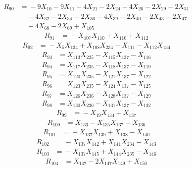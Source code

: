 \[\begin{aligned}
R_{90} &={}-9X_{10} - 9X_{11} - 4X_{21} - 2X_{24} - 4X_{26} - 2X_{29} - 2X_{31}\\
&\quad{} - 4X_{32} - 2X_{34} - 2X_{36} - 4X_{39} - 2X_{40} - 2X_{43} - 2X_{47}\\
&\quad{} - 4X_{68} - 2X_{69} + X_{105}
\end{aligned}\]
\[\begin{aligned}
R_{91} &={}-X_{107}X_{110} + X_{110} + X_{112}
\end{aligned}\]
\[\begin{aligned}
R_{92} &={}-X_{5}X_{134} + X_{108}X_{234} - X_{111} - X_{112}X_{134}
\end{aligned}\]
\[\begin{aligned}
R_{93} &={}X_{113}X_{235} - X_{115}X_{137} - X_{116}
\end{aligned}\]
\[\begin{aligned}
R_{94} &={}X_{117}X_{235} - X_{118}X_{137} - X_{119}
\end{aligned}\]
\[\begin{aligned}
R_{95} &={}X_{120}X_{235} - X_{121}X_{137} - X_{122}
\end{aligned}\]
\[\begin{aligned}
R_{96} &={}X_{123}X_{235} - X_{124}X_{137} - X_{125}
\end{aligned}\]
\[\begin{aligned}
R_{97} &={}X_{126}X_{236} - X_{128}X_{137} - X_{129}
\end{aligned}\]
\[\begin{aligned}
R_{98} &={}X_{130}X_{236} - X_{131}X_{137} - X_{132}
\end{aligned}\]
\[\begin{aligned}
R_{99} &={}-X_{19}X_{134} + X_{137}
\end{aligned}\]
\[\begin{aligned}
R_{100} &={}X_{133} - X_{135}X_{137} - X_{136}
\end{aligned}\]
\[\begin{aligned}
R_{101} &={}-X_{137}X_{139} + X_{138} - X_{140}
\end{aligned}\]
\[\begin{aligned}
R_{102} &={}-X_{137}X_{142} + X_{141}X_{234} - X_{143}
\end{aligned}\]
\[\begin{aligned}
R_{103} &={}-X_{137}X_{145} + X_{144}X_{235} - X_{146}
\end{aligned}\]
\[\begin{aligned}
R_{104} &={}X_{147} - 2X_{147}X_{149} + X_{150}
\end{aligned}\]
